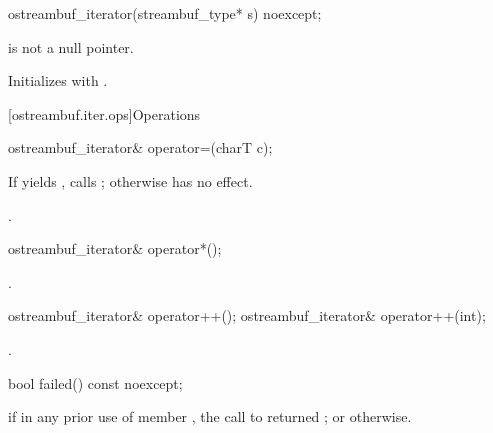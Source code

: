 %
\begin{itemdecl}
ostreambuf_iterator(streambuf_type* s) noexcept;
\end{itemdecl}

\begin{itemdescr}
\pnum
\expects
{}
is not a null pointer.

\pnum
\effects
Initializes  with .
\end{itemdescr}

[ostreambuf.iter.ops]{Operations}

%
\begin{itemdecl}
ostreambuf_iterator& operator=(charT c);
\end{itemdecl}

\begin{itemdescr}
\pnum
\effects
If
yields
,
calls
;
otherwise has no effect.

\pnum
\returns
{}.
\end{itemdescr}

%
\begin{itemdecl}
ostreambuf_iterator& operator*();
\end{itemdecl}

\begin{itemdescr}
\pnum
\returns
{}.
\end{itemdescr}

%
\begin{itemdecl}
ostreambuf_iterator& operator++();
ostreambuf_iterator& operator++(int);
\end{itemdecl}

\begin{itemdescr}
\pnum
\returns
{}.
\end{itemdescr}

%
\begin{itemdecl}
bool failed() const noexcept;
\end{itemdecl}

\begin{itemdescr}
\pnum
\returns
{}
if in any prior use of member
,
the call to
returned
;
or
otherwise.
\end{itemdescr}

